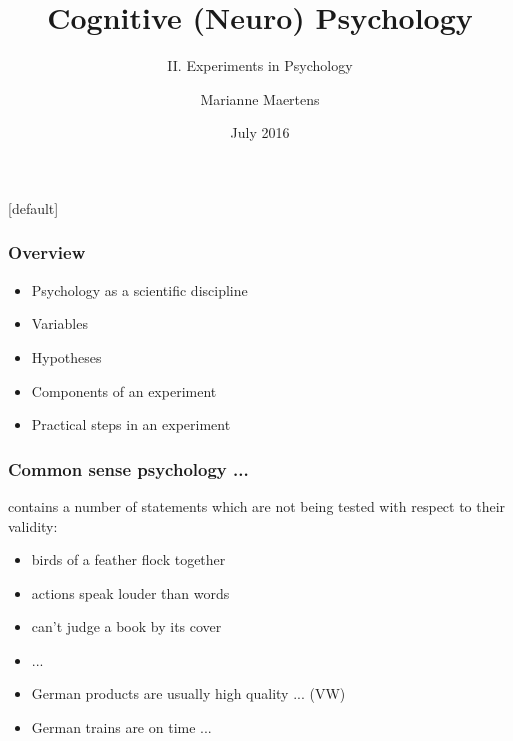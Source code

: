 \documentclass[]{beamer}
\title{ Cognitive (Neuro) Psychology }
\subtitle{II. Experiments in Psychology}
\author{ Marianne Maertens }
\institute[TU Berlin]{Technische Universit\"at Berlin}
\date{July 2016}
\begin{document}
[default]

\frame{\titlepage}



\begin{frame}
 \frametitle{Overview}
 \begin{itemize}
  \item Psychology as a scientific discipline
  \item Variables
  \item Hypotheses
  \item Components of an experiment
  \item Practical steps in an experiment
 \end{itemize}
\end{frame}


\begin{frame}
 \frametitle{Common sense psychology ...}
contains a number of statements which are not being tested with respect to their validity:\\

  \begin{itemize}
   \item birds of a feather flock together
   \item actions speak louder than words
   \item can't judge a book by its cover
   \item ... 
   \item German products are usually high quality ... (VW)
   \item German trains are on time ...
  \end{itemize}
\end{frame}
\end{document}
